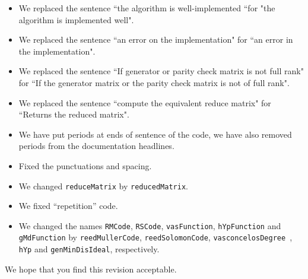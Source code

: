 \documentclass[12pt]{amsart}
\theoremstyle{plain}
\begin{document}
\begin{itemize}
\item We replaced the sentence ``the algorithm is well-implemented ``for "the algorithm is implemented well".
\item We replaced the sentence ``an error on the implementation" for ``an error in the implementation".
\item We replaced the sentence ``If generator or parity check matrix is not full rank" for ``If the generator matrix or the parity check matrix is not of full rank".
\item We replaced the sentence ``compute the equivalent reduce matrix" for ``Returns the reduced matrix".
\item We have put periods at ends of sentence of the code, we have also removed periods from the documentation headlines.
\item Fixed the punctuations and spacing.
\item We changed {\tt reduceMatrix} by {\tt reducedMatrix}.
\item We fixed ``repetition'' code.
\item We changed the names {\tt RMCode}, {\tt RSCode}, {\tt vasFunction}, {\tt hYpFunction} and {\tt gMdFunction} by {\tt reedMullerCode}, {\tt reedSolomonCode}, {\tt vasconcelosDegree }, {\tt hYp} and {\tt genMinDisIdeal}, respectively.
\end{itemize}



We hope that you find this revision acceptable. 
\end{document}

